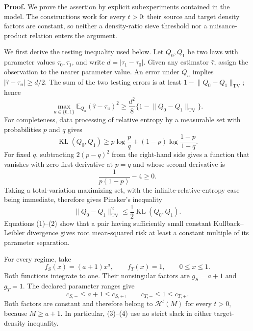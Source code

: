 \textbf{Proof.}
We prove the assertion by explicit subexperiments contained in the model. The constructions work for every \(t>0\): their source and target density factors are constant, so neither a density-ratio sieve threshold nor a nuisance-product relation enters the argument.

We first derive the testing inequality used below. Let \(Q_0,Q_1\) be two laws with parameter values \(\tau_0,\tau_1\), and write \(d=|\tau_1-\tau_0|\). Given any estimator \(\widehat\tau\), assign the observation to the nearer parameter value. An error under \(Q_u\) implies \(|\widehat\tau-\tau_u|\ge d/2\). The sum of the two testing errors is at least \(1-\lVert Q_0-Q_1\rVert_{\mathrm{TV}}\); hence
\[
 \max_{u\in\{0,1\}}\mathbb E_{Q_u}
       (\widehat\tau-\tau_u)^2
 \ge \frac{d^2}{8}
       \{1-\lVert Q_0-Q_1\rVert_{\mathrm{TV}}\}.
\tag{1}
\]
For completeness, data processing of relative entropy by a measurable set with probabilities \(p\) and \(q\) gives
\[
 \operatorname{KL}(Q_0,Q_1)\ge
 p\log\frac pq+(1-p)\log\frac{1-p}{1-q}.
\]
For fixed \(q\), subtracting \(2(p-q)^2\) from the right-hand side gives a function that vanishes with zero first derivative at \(p=q\) and whose second derivative is
\[
 \frac1{p(1-p)}-4\ge0.
\]
Taking a total-variation maximizing set, with the infinite-relative-entropy case being immediate, therefore gives Pinsker's inequality
\[
 \lVert Q_0-Q_1\rVert_{\mathrm{TV}}^2
 \le\frac12\operatorname{KL}(Q_0,Q_1).
\tag{2}
\]
Equations (1)--(2) show that a pair having sufficiently small constant Kullback--Leibler divergence gives root mean-squared risk at least a constant multiple of its parameter separation.

For every regime, take
\[
 f_S(x)=(a+1)x^a,
 \qquad f_T(x)=1,
 \qquad 0\le x\le1.
\tag{3}
\]
Both functions integrate to one. Their nonsingular factors are \(g_S=a+1\) and \(g_T=1\). The declared parameter ranges give
\[
 c_{S,-}\le a+1\le c_{S,+},
 \qquad
 c_{T,-}\le1\le c_{T,+}.
\tag{4}
\]
Both factors are constant and therefore belong to \(\mathcal H^t(M)\) for every \(t>0\), because \(M\ge a+1\). In particular, (3)--(4) use no strict slack in either target-density inequality.

